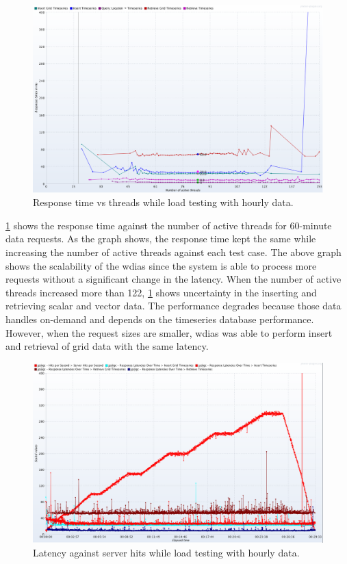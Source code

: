 \begin{figure}[htp]
    \centering
    \includegraphics[width=1.0\textwidth]{results/obs/all/obs_all_60m_response_times_vs_threads.png}
    \caption{Response time vs threads while load testing with hourly data.}
    \label{fi:test_obs_all_60m_response_vs_threads}
\end{figure}
\cref{fi:test_obs_all_60m_response_vs_threads} shows the response time against the number of active threads for 60-minute data requests. As the graph shows, the response time kept the same while increasing the number of active threads against each test case. The above graph shows the scalability of the \acrshort{wdias} since the system is able to process more requests without a significant change in the latency. When the number of active threads increased more than 122, \cref{fi:test_obs_all_60m_response_vs_threads} shows uncertainty in the inserting and retrieving scalar and vector data. The performance degrades because those data handles on-demand and depends on the timeseries database performance. 
However, when the request sizes are smaller, \acrshort{wdias} was able to perform insert and retrieval of grid data with the same latency.

\begin{figure}[htp]
    \centering
    \includegraphics[width=1.0\textwidth]{results/obs/all/obs_all_60m_res_latencies_against_hits.png}
    \caption{Latency against server hits while load testing with hourly data.}
    \label{fi:test_obs_all_60m_latency}
\end{figure}

